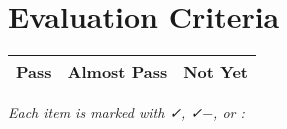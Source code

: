 \documentclass[11pt]{article}
\begin{document}


\newpage
\section*{Evaluation Criteria}

\begin{table}[h!]
    \centering
    \begin{tabularx}{\textwidth}{|XXX|}
        \hline
        \textbf{Pass} & \textbf{Almost Pass} & \textbf{Not Yet} \\
        \hline
    \end{tabularx}
\end{table}

\textit{Each item is marked with \faCheck, \faCheck$-$, or \faTimes:}
\end{document}
